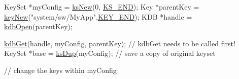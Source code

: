 \begin{DoxyCodeInclude}
KeySet *myConfig = \hyperlink{group__keyset_ga671e1aaee3ae9dc13b4834a4ddbd2c3c}{ksNew}(0, \hyperlink{kdbenum_8c_a7a28fce3773b2c873c94ac80b8b4cd54}{KS\_END});
Key *parentKey = \hyperlink{group__key_gad23c65b44bf48d773759e1f9a4d43b89}{keyNew}(\textcolor{stringliteral}{"system/sw/MyApp"},\hyperlink{group__key_gga91fb3178848bd682000958089abbaf40aa8adb6fcb92dec58fb19410eacfdd403}{KEY\_END});
KDB *handle = \hyperlink{group__kdb_ga6808defe5870f328dd17910aacbdc6ca}{kdbOpen}(parentKey);

\hyperlink{group__kdb_ga28e385fd9cb7ccfe0b2f1ed2f62453a1}{kdbGet}(handle, myConfig, parentKey); \textcolor{comment}{// kdbGet needs to be called first!}
KeySet *base = \hyperlink{group__keyset_gac59e4b328245463f1451f68d5106151c}{ksDup}(myConfig); \textcolor{comment}{// save a copy of original keyset}

\textcolor{comment}{// change the keys within myConfig}


\end{DoxyCodeInclude}
